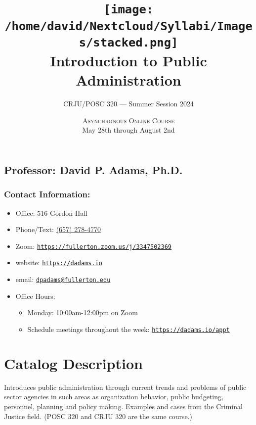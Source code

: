 \documentclass[11pt, letterpaper]{article}
\begin{document}
\title{\texttt{[image: /home/david/Nextcloud/Syllabi/Images/stacked.png]} \\\textbf{Introduction to Public Administration}}
\author{CRJU/POSC 320 — Summer Session 2024}
\date{\textsc{Asynchronous Online Course} \\ 
May 28th through August 2nd}
\maketitle


\subsection*{Professor: David P. Adams, Ph.D.}

\subsubsection*{Contact Information:}


\begin{itemize}
	\item Office: 516 Gordon Hall
	\item Phone/Text: \href{tel:+16572784770}{(657) 278-4770}
	\item Zoom: \href{https://fullerton.zoom.us/j/3347502369}{\texttt{https://fullerton.zoom.us/j/3347502369}}
	\item website: \href{https://dadams.io}{\texttt{https://dadams.io}}
	\item email: \href{dpadams@fullerton.edu}{\texttt{dpadams@fullerton.edu}}
	\item Office Hours:
        \begin{itemize}
            \item Monday: 10:00am-12:00pm on Zoom
            \item Schedule meetings throughout the week: \href{https://dadams.io/appt}{\texttt{https://dadams.io/appt}}
        \end{itemize}  
\end{itemize}


\section{Catalog Description}

Introduces public administration through current trends and problems of public sector agencies in such areas as organization behavior, public budgeting, personnel, planning and policy making. Examples and cases from the Criminal Justice field. (POSC 320 and CRJU 320 are the same course.)
\end{document}
